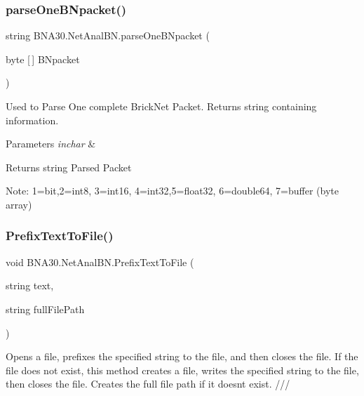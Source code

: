 \subsubsection{\texorpdfstring{parseOneBNpacket()}{parseOneBNpacket()}}
{\footnotesize\ttfamily string B\+N\+A30.\+Net\+Anal\+B\+N.\+parse\+One\+B\+Npacket (\begin{DoxyParamCaption}\item[{byte \mbox{[}$\,$\mbox{]}}]{B\+Npacket }\end{DoxyParamCaption})\hspace{0.3cm}{\ttfamily [inline]}}



Used to Parse One complete Brick\+Net Packet. Returns string containing information. 


\begin{DoxyParams}{Parameters}
{\em inchar} & \\
\hline
\end{DoxyParams}
\begin{DoxyReturn}{Returns}
string Parsed Packet
\end{DoxyReturn}
Note\+: 1=bit,2=int8, 3=int16, 4=int32,5=float32, 6=double64, 7=buffer (byte array)\mbox{\label{class_b_n_a30_1_1_net_anal_b_n_a34c16bd9ddcea03cdf6f492c95dbd9b1}} 
\subsubsection{\texorpdfstring{PrefixTextToFile()}{PrefixTextToFile()}}
{\footnotesize\ttfamily void B\+N\+A30.\+Net\+Anal\+B\+N.\+Prefix\+Text\+To\+File (\begin{DoxyParamCaption}\item[{string}]{text,  }\item[{string}]{full\+File\+Path }\end{DoxyParamCaption})\hspace{0.3cm}{\ttfamily [inline]}}





Opens a file, prefixes the specified string to the file, and then closes the file. If the file does not exist, this method creates a file, writes the specified string to the file, then closes the file. Creates the full file path if it doesn\textquotesingle{}t exist. /// 


